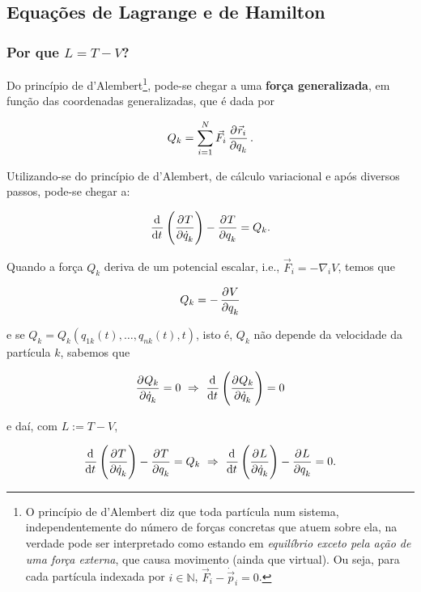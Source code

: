 \subsection{Equações de Lagrange e de Hamilton}
\label{ssec:lagrange_hamilton}

\subsubsection{Por que $L = T - V$?}
\label{sssec:lagrange_eq}

Do princípio de d'Alembert\footnote{O princípio de d'Alembert diz que toda
    partícula num sistema, independentemente do número de forças concretas que
    atuem sobre ela, na verdade pode ser interpretado como estando em
    \textit{equilíbrio exceto pela ação de uma força externa}, que causa
movimento (ainda que virtual).  Ou seja, para cada partícula indexada por $i \in
\mathbb{N}$, $\vec F_i - \dot{\vec p}_i = 0$.}, pode-se chegar a uma
\textbf{força generalizada}, em função das coordenadas generalizadas, que é dada
por

\begin{equation*}
    Q_k = \sum_{i=1}^N \vec F_i \dpd{\vec r_i}{q_k} \text{.}
\end{equation*}

Utilizando-se do princípio de d'Alembert, de cálculo variacional e após diversos
passos, pode-se chegar a:

\begin{equation}
    \label{eq:lagrange_original}
    \dod{}{t} \del{\dpd{T}{\dot q_k}} - \dpd{T}{q_k} = Q_k \text{.}
\end{equation}

Quando a força $Q_k$ deriva de um potencial escalar, i.e., $\vec F_i = -
\nabla_i V$, temos que

\begin{equation*}
    Q_k = - \dpd{V}{q_k}
\end{equation*}

e se $Q_k = Q_k(q_{1k}(t), \ldots, q_{nk}(t), t)$, isto é, $Q_k$ não depende da
velocidade da partícula $k$, sabemos que

\begin{equation*}
    \dpd{Q_k}{\dot q_k} = 0 ~\Rightarrow~ \dod{}{t} \del{\dpd{Q_k}{\dot q_k}} =
    0
\end{equation*}

e daí, com $L := T - V$,

\begin{equation*}
    \dod{}{t} \del{\dpd{T}{\dot q_k}} - \dpd{T}{q_k} = Q_k
    ~\Rightarrow~
    \dod{}{t} \del{\dpd{L}{\dot q_k}} - \dpd{L}{q_k} = 0 \text{.}
\end{equation*}

